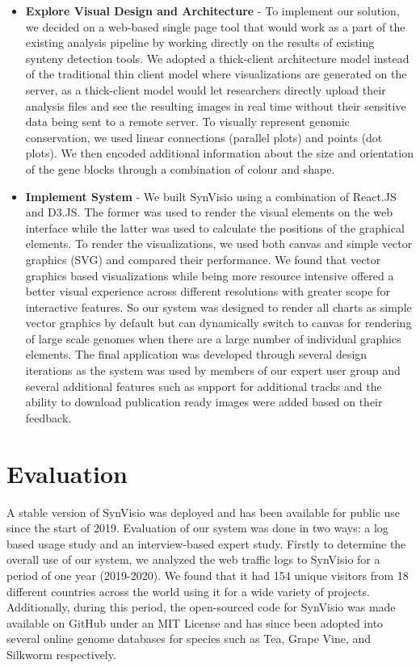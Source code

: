 \begin{itemize}
    \item \textbf{Explore Visual Design and Architecture} - 
    To implement our solution, we decided on a web-based single page tool that would work as a part of the existing analysis pipeline by working directly on the results of existing synteny detection tools. We adopted a thick-client architecture model instead of the traditional thin client model where visualizations are generated on the server, as a thick-client model would let researchers directly upload their analysis files and see the resulting images in real time without their sensitive data being sent to a remote server. To visually represent genomic conservation, we used linear connections (parallel plots) and points (dot plots). We then encoded additional information about the size and orientation of the gene blocks through a combination of colour and shape.
   
   \item \textbf{Implement System} - We built SynVisio using a combination of React.JS\cite{react} and D3.JS\cite{d3js}. The former was used to render the visual elements on the web interface while the latter was used to calculate the positions of the graphical elements. To render the visualizations, we used both canvas and simple vector graphics (SVG) and compared their performance. We found that vector graphics based visualizations while being more resource intensive offered a better visual experience across different resolutions with greater scope for interactive features. So our system was designed to render all charts as simple vector graphics by default but can dynamically switch to canvas for rendering of large scale genomes when there are a large number of individual graphics elements. The final application was developed through several design iterations as the system was used by members of our expert user group and several additional features such as support for additional tracks and the ability to download publication ready images were added based on their feedback. 

\end{itemize}

\section{Evaluation}

A stable version of SynVisio was deployed and has been available for public use since the start of 2019. Evaluation of our system was done in two ways: a log based usage study and an interview-based expert study. Firstly to determine the overall use of our system, we analyzed the web traffic logs to SynVisio for a period of one year (2019-2020). We found that it had 154 unique visitors from 18 different countries across the world using it for a wide variety of projects. Additionally, during this period, the open-sourced code for SynVisio was made available on GitHub under an MIT License and has since been adopted into several online genome databases for species such as Tea, Grape Vine, and Silkworm respectively.

